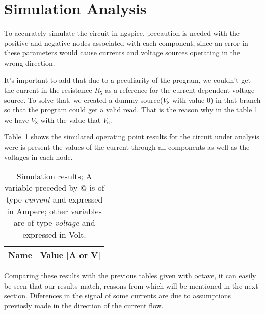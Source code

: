 \section{Simulation Analysis}
\label{sec:simulation}

To accurately simulate the circuit in ngspice, precaution is needed with the positive and negative nodes associated with each component, since an error in these parameters would cause currents and voltage sources operating in the wrong direction.

It's important to add that due to a peculiarity of the program, we couldn't get the current in the resistance $R_5$ as a reference for the current dependent voltage source. To solve that, we created a dummy source($V_8$ with value 0) in that branch so that the program could get a valid read. That is the reason why in the table \ref{tab:op} we have $V_8$ with the value that $V_6$.

Table~\ref{tab:op} shows the simulated operating point results for the circuit
under analysis were is present the values of the current through all components as well as the voltages in each node. 


\begin{table}[h]
  \centering
  \begin{tabular}{|l|r|}
    \hline    
    {\bf Name} & {\bf Value [A or V]} \\ \hline
    
  \end{tabular}
  \caption{Simulation results; A variable preceded by @ is of type {\em current}
    and expressed in Ampere; other variables are of type {\it voltage} and expressed in
    Volt.}
  \label{tab:op}
\end{table}


Comparing these results with the previous tables given with octave, it can easily be seen that our results match, reasons from which will be mentioned in the next section.
Diferences in the signal of some currents are due to assumptions previosly made in the direction of 
the current flow.

